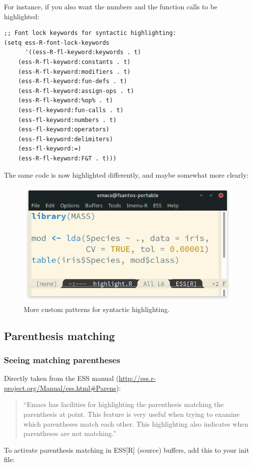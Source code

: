 \documentclass[11pt]{article}
\begin{document}
For instance, if you also want the numbers and the function calls to be highlighted:

\begin{verbatim}
;; Font lock keywords for syntactic highlighting:
(setq ess-R-font-lock-keywords
      '((ess-R-fl-keyword:keywords . t)
	(ess-R-fl-keyword:constants . t)
	(ess-R-fl-keyword:modifiers . t)
	(ess-R-fl-keyword:fun-defs . t)
	(ess-R-fl-keyword:assign-ops . t)
	(ess-R-fl-keyword:%op% . t)
	(ess-fl-keyword:fun-calls . t)
	(ess-fl-keyword:numbers . t)
	(ess-fl-keyword:operators)
	(ess-fl-keyword:delimiters)
	(ess-fl-keyword:=)
	(ess-R-fl-keyword:F&T . t)))
\end{verbatim}

The same code is now highlighted differently, and maybe somewhat more clearly:

\begin{figure}[htbp]
\centering
\includegraphics[width=0.55 \textwidth]{./images/highlight_custom.png}
\caption{\label{fig:orgc94beae}More custom patterns for syntactic highlighting.}
\end{figure}

\subsection{Parenthesis matching}
\label{sec:org8ef6990}
\subsubsection{Seeing matching parentheses}
\label{sec:org0c63349}
Directly taken from the ESS manual (\url{http://ess.r-project.org/Manual/ess.html\#Parens}):

\begin{quote}
``Emacs has facilities for highlighting the parenthesis matching the parenthesis at point. This feature is very useful when trying to examine which parentheses match each other. This highlighting also indicates when parentheses are not matching.''
\end{quote}

To activate parenthesis matching in ESS[R] (source) buffers, add this to your init file:
\end{document}
